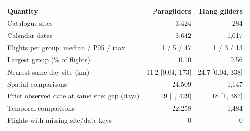\begin{tabular}{lrr}
\toprule
Quantity & Paragliders & Hang gliders \\
\midrule
Catalogue sites & 3,424 & 284 \\
Calendar dates & 3,642 & 1,017 \\
Flights per group: median / P95 / max & 1 / 5 / 47 & 1 / 3 / 13 \\
Largest group (\% of flights) & 0.10 & 0.56 \\
Nearest same-day site (km) & 11.2 [0.04, 173] & 24.7 [0.04, 338] \\
Spatial comparisons & 24,509 & 1,147 \\
Prior observed date at same site: gap (days) & 19 [1, 429] & 18 [1, 382] \\
Temporal comparisons & 22,258 & 1,484 \\
Flights with missing site/date keys & 0 & 0 \\
\bottomrule
\end{tabular}
